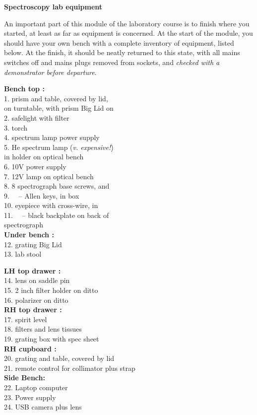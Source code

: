 \documentclass[12pt]{article}
\begin{document}
\newpage

{\large\bf Spectroscopy lab equipment}

An important part of this module of the laboratory course is to finish where you started, at least as far as equipment is concerned. At the start of the module, you should have your own bench with a complete inventory of equipment, listed below. At the finish, it should be neatly returned to this state, with all mains switches off and mains plugs removed from sockets, and {\sl checked with a demonstrator before departure}. 

\parbox[t]{80mm}{
{\bf Bench top : } \\
1. prism and table, covered by lid,\\
\hspace*{6mm}on turntable, with prism Big Lid on\\
2. safelight with filter \\
3. torch\\
4. spectrum lamp power supply\\
5. He spectrum lamp ({\em v. expensive!\/})\\
\hspace*{6mm}in holder on optical bench\\
6. 10V power supply\\
7. 12V lamp on optical bench\\
8. 8 spectrograph base screws, and\\
9. ~~-- Allen keys, in box\\
10. eyepiece with cross-wire, in\\
11. ~~-- black backplate on back of\\
\hspace*{6mm}spectrograph\\

{\bf Under bench : }\\
12. grating Big Lid\\
13. lab stool}
\parbox[t]{80mm}{
{\bf LH top drawer : }\\
14. lens on saddle pin\\
15. 2 inch filter holder on ditto\\
16. polarizer on ditto\\

{\bf RH top drawer : }\\
17. spirit level\\
18. filters and lens tissues\\
19. grating box with spec sheet\\

{\bf RH cupboard : }\\
20. grating and table, covered by lid\\
21. remote control for collimator plus strap\\

{\bf Side Bench: }\\
22. Laptop computer\\
23. Power supply \\
24. USB camera plus lens\\
}
\end{document}
